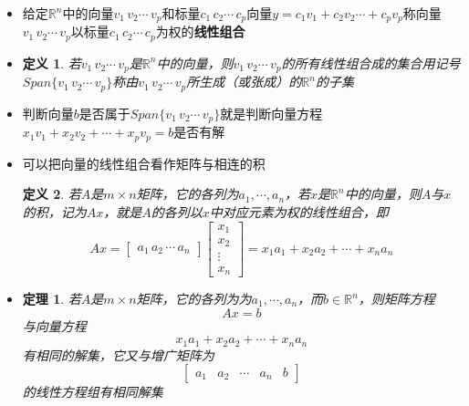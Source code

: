 \documentclass[UTF8]{report}
\newtheorem{define}{定义}
\newtheorem{theorem}{定理}
\begin{document}
\begin{itemize}
		\item 给定$\mathbb{R}^n$中的向量$v_1\,v_2\cdots\,v_p$和标量$c_1\,c_2\cdots\,c_p$向量$y=c_1v_1+c_2v_2\cdots+c_pv_p$称向量$v_1\,v_2\cdots\, v_p$以标量$c_1\,c_2\cdots\,c_p$为权的\textbf{线性组合}
		
		\item \begin{define}
			若$v_1\,v_2\cdots\,v_p$是$\mathbb{R}^n$中的向量，则$v_1\,v_2\cdots\,v_p$的所有线性组合成的集合用记号$Span\{v_1\,v_2\cdots\,v_p\}$称由$v_1\,v_2\cdots\,v_p$所生成（或张成）的$\mathbb{R}^n$的子集
			\end{define}
		
		\item 判断向量$b$是否属于$Span\{v_1\,v_2\cdots\,v_p\}$就是判断向量方程$ x_1v_1+x_2v_2+\cdots+x_pv_p=b $是否有解
		
		\item 可以把向量的线性组合看作矩阵与相连的积\begin{define}
			若$ A $是$ m \times n $矩阵，它的各列为$ a_1,\cdots,a_n $，若$ x $是$ \mathbb{R}^n $中的向量，则$ A $与$ x $的积，记为$ Ax $，就是$ A $的各列以$ x $中对应元素为权的线性组合，即\begin{displaymath}
			Ax=\begin{bmatrix} a_1\,a_2\,\cdots\,a_n\end{bmatrix} \begin{bmatrix} x_1 \\ x_ 2 \\ \vdots \\ x_n\end{bmatrix} = 
			x_1a_1+x_2a_2+\cdots+x_na_n
			\end{displaymath}
		\end{define}%
	
		\item \begin{theorem}
			若$ A $是$ m \times n $矩阵，它的各列为为$ a_1,\cdots,a_n $，而$ b \in \mathbb{R}^n $，则矩阵方程
			\begin{displaymath}
				Ax=b
			\end{displaymath}  与向量方程
			\begin{displaymath}
			x_1a_1+x_2a_2+\cdots+x_na_n 
			\end{displaymath}
			有相同的解集，它又与增广矩阵为\begin{displaymath} \begin{bmatrix}
			a_1 & a_2 & \cdots & a_n & b
			\end{bmatrix}\end{displaymath} 
			的线性方程组有相同解集
		\end{theorem}
	

\end{itemize}
\end{document}

